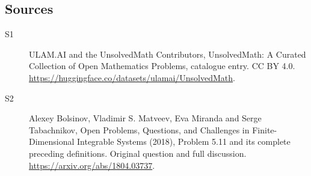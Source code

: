 \documentclass[11pt]{article}
\begin{document}
\subsection{Sources}
\begin{description}
\item[\hypertarget{source:statement:1}{S1}] ULAM.AI and the UnsolvedMath Contributors, UnsolvedMath: A Curated Collection of Open Mathematics Problems, catalogue entry. CC BY 4.0. \url{https://huggingface.co/datasets/ulamai/UnsolvedMath}.
\item[\hypertarget{source:statement:2}{S2}] Alexey Bolsinov, Vladimir S. Matveev, Eva Miranda and Serge Tabachnikov, Open Problems, Questions, and Challenges in Finite-Dimensional Integrable Systems (2018), Problem 5.11 and its complete preceding definitions. Original question and full discussion. \url{https://arxiv.org/abs/1804.03737}.

\end{description}
\label{end:statement}
\end{document}
